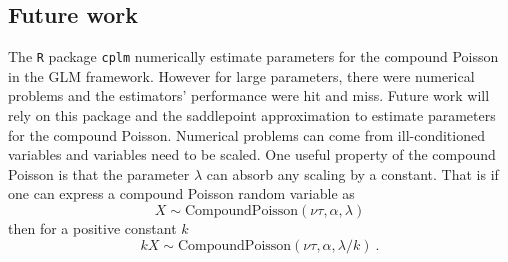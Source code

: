 \documentclass[a4paper]{proc}
\begin{document}
\subsection{Future work}
The \texttt{R} package \texttt{cplm} \cite{zhang2013likelihood} numerically estimate parameters for the compound Poisson in the GLM framework. However for large parameters, there were numerical problems and the estimators' performance were hit and miss. Future work will rely on this package and the saddlepoint approximation to estimate parameters for the compound Poisson. Numerical problems can come from ill-conditioned variables and variables need to be scaled. One useful property of the compound Poisson is that the parameter $\lambda$ can absorb any scaling by a constant. That is if one can express a compound Poisson random variable as
\begin{equation}
X\sim\text{CompoundPoisson}\left(\nu\tau,\alpha,\lambda\right)
\end{equation}
then for a positive constant $k$
\begin{equation}
kX\sim\text{CompoundPoisson}\left(\nu\tau,\alpha,\lambda/k\right) \ .
\end{equation}



\end{document}
